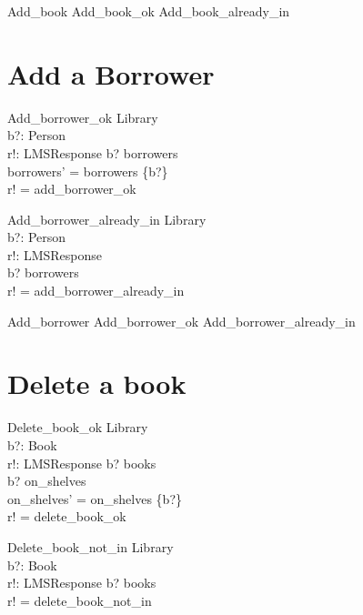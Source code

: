 \documentclass[11pt, fuzz]{article}
\begin{document}
\begin{zed}
    Add\_book  Add\_book\_ok \lor Add\_book\_already\_in
\end{zed}


\section{Add a Borrower}

\begin{schema}{Add\_borrower\_ok}
    \Delta Library  \\
    b?: Person      \\
    r!: LMSResponse
\where
    b? \notin borrowers                \\
    borrowers' = borrowers \cup \{b?\} \\
    r! = add\_borrower\_ok    
\end{schema}

\begin{schema}{Add\_borrower\_already\_in}
    \Xi Library     \\
    b?: Person      \\
    r!: LMSResponse \\
\where
    b? \in borrowers                \\
    r! = add\_borrower\_already\_in
\end{schema}

\begin{zed}
    Add\_borrower  Add\_borrower\_ok \lor Add\_borrower\_already\_in
\end{zed}

\section{Delete a book}

\begin{schema}{Delete\_book\_ok}
    \Delta Library  \\
    b?: Book        \\
    r!: LMSResponse
\where
    b? \in books                                \\
    b? \in on\_shelves                          \\
    on\_shelves' = on\_shelves \setminus \{b?\} \\
    r! = delete\_book\_ok
\end{schema}

\begin{schema}{Delete\_book\_not\_in}
    \Xi Library     \\
    b?: Book        \\
    r!: LMSResponse
\where
    b? \notin books            \\
    r! = delete\_book\_not\_in \\
\end{schema}
\end{document}
